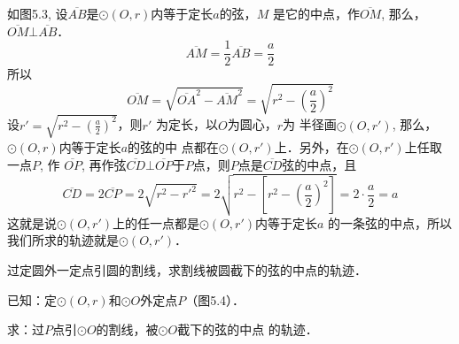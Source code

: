 \begin{solution}
    如图5.3, 设$\overline{AB}$是$\odot (O,r)$内等于定长$a$的弦，$M$
是它的中点，作$\overline{OM}$, 那么，$\overline{OM}\bot \overline{AB}$．
\[\overline{AM}=\frac{1}{2}\overline{AB}=\frac{a}{2}\]
所以
\[\overline{OM}=\sqrt{\overline{OA}^2-\overline{AM}^2}=\sqrt{r^2-\left(\frac{a}{2}\right)^2}\]
设$r'=\sqrt{r^2-\left(\frac{a}{2}\right)^2}$，则$r'$
为定长，以$O$为圆心，$r$为
半径画$\odot (O,r')$, 那么，$\odot (O,r)$内等于定长$a$的弦的中
点都在$\odot (O,r')$上．另外，在$\odot (O,r')$上任取一点$P$, 作
$\overline{OP}$, 再作弦$\overline{CD}\bot\overline{OP}$于$P$点，则$P$点是$\overline{CD}$弦的中点，且
\[\overline{CD}=2\overline{CP}=2\sqrt{r^2-{r'}^2}=2\sqrt{r^2-\left[r^2-\left(\frac{a}{2}\right)^2\right]}=2\cdot\frac{a}{2}=a\]
这就是说$\odot (O,r')$上的任一点都是$\odot (O,r')$内等于定长$a$
的一条弦的中点，所以我们所求的轨迹就是$\odot (O,r')$．
\end{solution}

\begin{example}
    过定圆外一定点引圆的割线，求割线被圆截下的弦的中点的轨迹．

    已知：定$\odot (O,r)$和$\odot O$外定点$P$（图5.4）．
    
    求：过$P$点引$\odot O$的割线，被$\odot O$截下的弦的中点
    的轨迹．
\end{example}


\begin{figure}[htp]
    \centering
{}
    \caption{}
\end{figure}

